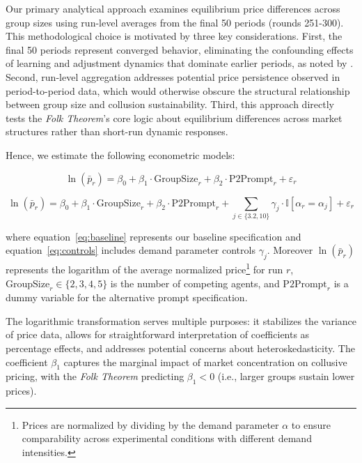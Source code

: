 Our primary analytical approach examines equilibrium price differences across group sizes using run-level averages from the final 50 periods (rounds 251-300). This methodological choice is motivated by three key considerations. First, the final 50 periods represent converged behavior, eliminating the confounding effects of learning and adjustment dynamics that dominate earlier periods, as noted by \textcite{fish_algorithmic_2025}. Second, run-level aggregation addresses potential price persistence observed in period-to-period data, which would otherwise obscure the structural relationship between group size and collusion sustainability. Third, this approach directly tests the \emph{Folk Theorem}'s core logic about equilibrium differences across market structures rather than short-run dynamic responses.

Hence, we estimate the following econometric models:

\begin{equation}\label{eq:baseline}
    \ln(\bar{p}_r) = \beta_0 + \beta_1 \cdot \text{GroupSize}_r + \beta_2 \cdot \text{P2Prompt}_r + \varepsilon_r
\end{equation}

\begin{equation}\label{eq:controls}
    \ln(\bar{p}_r) = \beta_0 + \beta_1 \cdot \text{GroupSize}_r + \beta_2 \cdot \text{P2Prompt}_r + \sum_{j \in \{3.2, 10\}} \gamma_j \cdot \mathbb{I}[\alpha_r = \alpha_j] + \varepsilon_r
\end{equation}

where equation~\eqref{eq:baseline} represents our baseline specification and equation~\eqref{eq:controls} includes demand parameter controls $\gamma_j$. Moreover $\ln(\bar{p}_r)$ represents the logarithm of the average normalized price\footnote{Prices are normalized by dividing by the demand parameter $\alpha$ to ensure comparability across experimental conditions with different demand intensities.} for run $r$, $\text{GroupSize}_r \in \{2,3,4,5\}$ is the number of competing agents, and $\text{P2Prompt}_r$ is a dummy variable for the alternative prompt specification.

The logarithmic transformation serves multiple purposes: it stabilizes the variance of price data, allows for straightforward interpretation of coefficients as percentage effects, and addresses potential concerns about heteroskedasticity. The coefficient $\beta_1$ captures the marginal impact of market concentration on collusive pricing, with the \emph{Folk Theorem} predicting $\beta_1 < 0$ (i.e., larger groups sustain lower prices).

